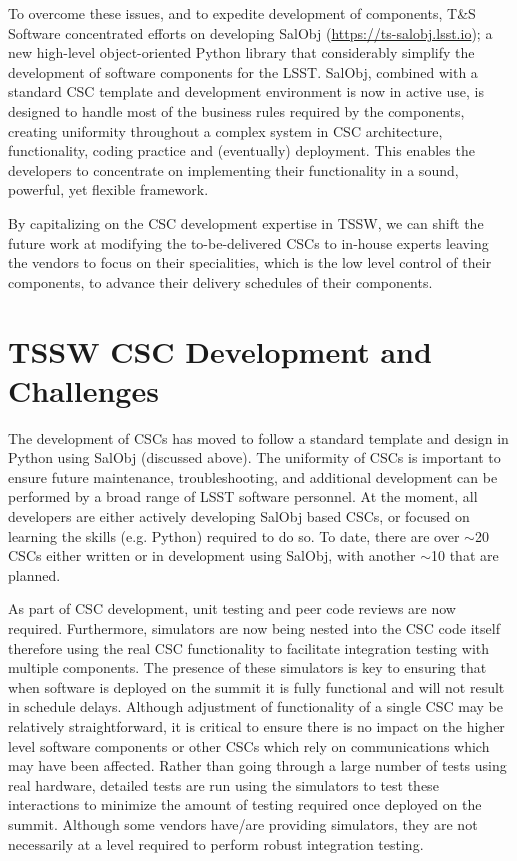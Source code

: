 \documentclass[TS,authoryear,toc]{lsstdoc}
\begin{document}
To overcome these issues, and to expedite development of components, T\&S Software concentrated 
efforts on developing SalObj (\url{https://ts-salobj.lsst.io}); a new high-level object-oriented 
Python library that considerably simplify the development of software components for the LSST.
SalObj, combined with a standard CSC template and development environment is now in active use, is designed to handle most of the business rules required by the components, creating uniformity throughout a complex system in CSC architecture, functionality, coding practice and (eventually) deployment. This enables the developers to concentrate on implementing their functionality in a sound, powerful, yet flexible framework. 

By capitalizing on the CSC development expertise in TSSW, we can shift the future work at modifying the to-be-delivered CSCs to in-house experts leaving the vendors to focus on their specialities, which is the low level control of their components, to advance their delivery schedules of their components. 

\section{TSSW CSC Development and Challenges}

The development of CSCs has moved to follow a standard template and design in Python using SalObj (discussed above). The uniformity of CSCs is important to ensure future maintenance, troubleshooting, and additional development can be performed by a broad range of LSST software personnel. At the moment, all developers are either actively developing SalObj based CSCs, or focused on learning the skills (e.g. Python) required to do so. To date, there are over $\sim$20 CSCs either written or in development using SalObj, with another $\sim$10 that are planned. 

As part of CSC development, unit testing and peer code reviews are now required. Furthermore, simulators are now being nested into the CSC code itself therefore using the real CSC functionality to facilitate integration testing with multiple components. The presence of these simulators is key to ensuring that when software is deployed on the summit it is fully functional and will not result in schedule delays. Although adjustment of functionality of a single CSC may be relatively straightforward, it is critical to ensure there is no impact on the higher level software components or other CSCs which rely on communications which may have been affected. Rather than going through a large number of tests using real hardware, detailed tests are run using the simulators to test these interactions to minimize the amount of testing required once deployed on the summit. Although some vendors have/are providing simulators, they are not necessarily at a level required to perform robust integration testing. 
\end{document}
